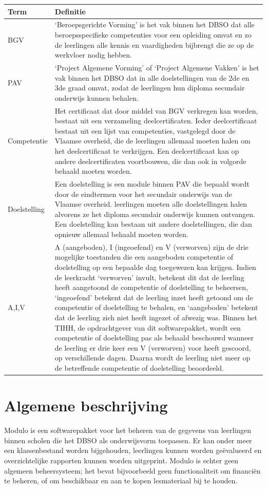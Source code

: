 \documentclass[a4paper]{article}
\begin{document}
\newpage
\begin{tabularx}{\textwidth}{l | X}
    Term & Definitie \\
    \hline \hline
    BGV & `Beroepsgerichte Vorming' is het vak binnen het DBSO dat alle beroepsspecifieke competenties voor een opleiding omvat en zo de leerlingen alle kennis en vaardigheden bijbrengt die ze op de werkvloer nodig hebben. \\
    \hline
    PAV & `Project Algemene Vorming' of `Project Algemene Vakken' is het vak binnen het DBSO dat in alle doelstellingen van de 2de en 3de graad omvat, zodat de leerlingen hun diploma secundair onderwijs kunnen behalen. \\
    \hline
    Competentie & Het certificaat dat door middel van BGV verkregen kan worden, bestaat uit een verzameling deelcertificaten. Ieder deelcertificaat bestaat uit een lijst van competenties, vastgelegd door de Vlaamse overheid, die de leerlingen allemaal moeten halen om het deelcertificaat te verkrijgen. Een deelcertificaat kan op andere deelcertificaten voortbouwen, die dan ook in volgorde behaald moeten worden. \cite{Competenties} \\
    \hline
    Doelstelling & Een doelstelling is een module binnen PAV die bepaald wordt door de eindtermen voor het secundair onderwijs van de Vlaamse overheid. leerlingen moeten alle doelstellingen halen alvorens ze het diploma secundair onderwijs kunnen ontvangen. Een doelstelling kan bestaan uit andere doelstellingen, die dan opnieuw allemaal behaald moeten worden. \cite{Doelstellingen} \\
    \hline
    A,I,V & A (aangeboden), I (ingeoefend) en V (verworven) zijn de drie mogelijke toestanden die een aangeboden competentie of doelstelling op een bepaalde dag toegewezen kan krijgen. Indien de leerkracht `verworven' invult, betekent dit dat de leerling heeft aangetoond de competentie of doelstelling te beheersen, `ingeoefend' betekent dat de leerling inzet heeft getoond om de competentie of doelstelling te behalen, en `aangeboden' betekent dat de leerling zich niet heeft ingezet of afwezig was. Binnen het TIHH, de opdrachtgever van dit softwarepakket, wordt een competentie of doelstelling pas als behaald beschouwd wanneer de leerling er drie keer een V (verworven) voor heeft gescoord, op verschillende dagen. Daarna wordt de leerling niet meer op de betreffende competentie of doelstelling beoordeeld.
\end{tabularx}


\newpage
\section{Algemene beschrijving}  \label{sec:general_descr}%
Modulo is een softwarepakket voor het beheren van de gegevens van leerlingen binnen scholen die het DBSO als onderwijsvorm toepassen. Er kan onder meer een klassenbestand worden bijgehouden, leerlingen kunnen worden geëvalueerd en overzichtelijke rapporten kunnen worden uitgeprint. Modulo is echter geen algemeen beheersysteem; het bevat bijvoorbeeld geen functionaliteit om financiën te beheren, of om beschikbaar en aan te kopen lesmateriaal bij te houden.
\end{document}
